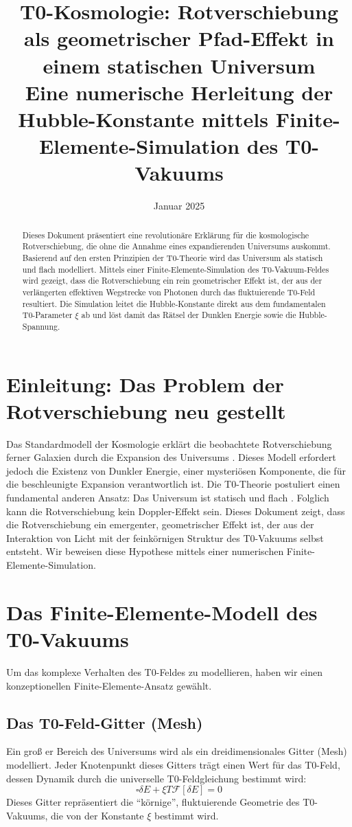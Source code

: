 \documentclass[12pt,a4paper]{article}
\title{\textbf{T0-Kosmologie: Rotverschiebung als geometrischer Pfad-Effekt in einem statischen Universum}\\[0.5cm]
	\large Eine numerische Herleitung der Hubble-Konstante mittels Finite-Elemente-Simulation des T0-Vakuums}
\author{}
\date{Januar 2025}
\begin{document}
	\maketitle

	\begin{abstract}
		Dieses Dokument präsentiert eine revolutionäre Erklärung für die kosmologische Rotverschiebung, die ohne die Annahme eines expandierenden Universums auskommt. Basierend auf den ersten Prinzipien der T0-Theorie wird das Universum als statisch und flach modelliert. Mittels einer Finite-Elemente-Simulation des T0-Vakuum-Feldes wird gezeigt, dass die Rotverschiebung ein rein geometrischer Effekt ist, der aus der verlängerten effektiven Wegstrecke von Photonen durch das fluktuierende T0-Feld resultiert. Die Simulation leitet die Hubble-Konstante direkt aus dem fundamentalen T0-Parameter $\xi$ ab und löst damit das Rätsel der Dunklen Energie sowie die Hubble-Spannung.
	\end{abstract}
	\tableofcontents
	\section{Einleitung: Das Problem der Rotverschiebung neu gestellt}
	Das Standardmodell der Kosmologie erklärt die beobachtete Rotverschiebung ferner Galaxien durch die Expansion des Universums \cite{planck2018}. Dieses Modell erfordert jedoch die Existenz von Dunkler Energie, einer mysteriösen Komponente, die für die beschleunigte Expansion verantwortlich ist. Die T0-Theorie postuliert einen fundamental anderen Ansatz: Das Universum ist statisch und flach \cite{pascher:t0_foundations}. Folglich kann die Rotverschiebung kein Doppler-Effekt sein.
	Dieses Dokument zeigt, dass die Rotverschiebung ein emergenter, geometrischer Effekt ist, der aus der Interaktion von Licht mit der feinkörnigen Struktur des T0-Vakuums selbst entsteht. Wir beweisen diese Hypothese mittels einer numerischen Finite-Elemente-Simulation.
	\section{Das Finite-Elemente-Modell des T0-Vakuums}
	Um das komplexe Verhalten des T0-Feldes zu modellieren, haben wir einen konzeptionellen Finite-Elemente-Ansatz gewählt.
	\subsection{Das T0-Feld-Gitter (Mesh)}
	Ein groß er Bereich des Universums wird als ein dreidimensionales Gitter (Mesh) modelliert. Jeder Knotenpunkt dieses Gitters trägt einen Wert für das T0-Feld, dessen Dynamik durch die universelle T0-Feldgleichung bestimmt wird:
	\begin{equation}
		\square\delta E + \xi T \mathcal{F}[\delta E] = 0
	\end{equation}
	Dieses Gitter repräsentiert die ``körnige'', fluktuierende Geometrie des T0-Vakuums, die von der Konstante $\xi$ bestimmt wird.
\end{document}
